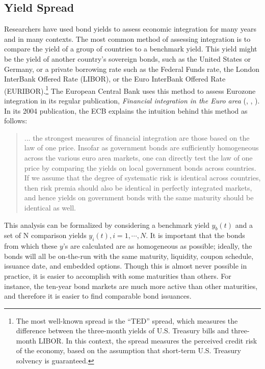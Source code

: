 \documentclass[3p]{elsarticle}
\begin{document}
\subsection{Yield Spread}
Researchers have used bond yields to assess economic integration for many years and in many contexts.  The most common method of assessing integration is to compare the yield of a group of countries to a benchmark yield.  This yield might be the yield of another country's sovereign bonds, such as the United States or Germany, or a private borrowing rate such as the Federal Funds rate, the London InterBank Offered Rate (LIBOR), or the Euro InterBank Offered Rate (EURIBOR).\footnote{The most well-known spread is the ``TED'' spread, which measures the difference between the three-month yields of U.S. Treasury bills and three-month LIBOR.  In this context, the spread measures the perceived credit risk of the economy, based on the assumption that short-term U.S. Treasury solvency is guaranteed.}  The European Central Bank uses this method to assess Eurozone integration in its regular publication, \textit{Financial integration in the Euro area} (\cite{ECB2004}, \cite{ECB2005}, \cite{ECB2007}).  In its 2004 publication, the ECB explains the intuition behind this method as follows:
\begin{quote}
	... the strongest measures of financial integration are those based on the law of one price.  Insofar as government bonds are sufficiently homogeneous across the various euro area markets, one can directly test the law of one price by comparing the yields on local government bonds across countries. If we assume that the degree of systematic risk is identical across countries, then risk premia should also be identical in perfectly integrated markets, and hence yields on government bonds with the same maturity should be identical as well.
\end{quote}

This analysis can be formalized by considering a benchmark yield $y_b(t)$ and a set of N comparison yields $y_i(t), i = 1, \cdots, N$.  It is important that the bonds from which these $y$'s are calculated are as homogeneous as possible; ideally, the bonds will all be on-the-run with the same maturity, liquidity, coupon schedule, issuance date, and embedded options.  Though this is almost never possible in practice, it is easier to accomplish with some maturities than others.  For instance, the ten-year bond markets are much more active than other maturities, and therefore it is easier to find comparable bond issuances.
\end{document}
